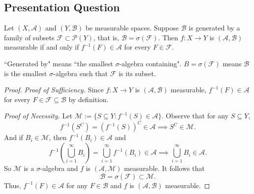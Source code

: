 \documentclass[class=book, crop=false]{standalone}
\begin{document}
        \subsection{Presentation Question}
        \begin{question}
            Let $(X, \mathcal{A})$ and $(Y, \mathcal{B})$ be measurable spaces. Suppose $\mathcal{B}$ is generated by a family of subsets $\mathscr{F} \subset \mathscr{P}(Y)$, that is, $\mathcal{B} = \sigma(\mathscr{F})$. Then $f: X \rightarrow Y$ is $(\mathcal{A}, \mathcal{B})$ measurable if and only if $f^{-1}(F) \in \mathcal{A}$ for every $F \in \mathscr{F}$.
        \end{question}
        \begin{remark}
            ``Generated by" means ``the smallest $\sigma$-algebra containing". $B = \sigma(\mathscr{F})$ means $\mathcal{B}$ is the smallest $\sigma$-algebra such that $\mathscr{F}$ is its subset.
        \end{remark}
        \begin{proof}
            \textit{Proof of Sufficiency.} Since $f : X \rightarrow Y$ is $(\mathcal{A}, \mathcal{B})$ measurable, $f^{-1}(F) \in \mathcal{A}$ for every $F \in \mathscr{F} \subseteq \mathcal{B}$ by definition.
    
            \noindent \textit{Proof of Necessity.} Let $\mathcal{M} := \{S \subseteq Y : f^{-1}(S) \in \mathcal{A}\}$. Observe that for any $S \subseteq Y$,
            \begin{equation*}
                f^{-1}(S^C) = (f^{-1}(S))^{C} \in \mathcal{A} \implies S^C \in \mathcal{M}. 
            \end{equation*}
            And if $B_i \in \mathcal{M}$, then $f^{-1}(B_i) \in \mathcal{A}$ and
            \begin{equation*}
                f^{-1}\left(\bigcup^{\infty}_{i = 1} B_i\right) = \bigcup^{\infty}_{i = 1} f^{-1}(B_i) \in \mathcal{A} \implies \bigcup^{\infty}_{i = 1} B_i \in \mathcal{A}.
            \end{equation*}
            So $\mathcal{M}$ is a $\sigma$-algebra and $f$ is $(\mathcal{A}, \mathcal{M})$ measurable. It follows that
            \begin{equation*}
                \mathcal{B} = \sigma(\mathscr{F}) \subset \mathcal{M}.
            \end{equation*}
            Thus, $f^{-1}(F) \in \mathcal{A}$ for any $F \in \mathcal{B}$ and $f$ is $(\mathcal{A}, \mathcal{B})$ measurable.
        \end{proof}
\end{document}
